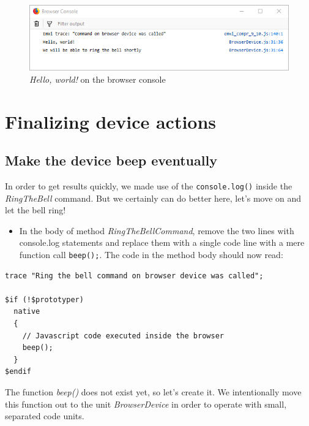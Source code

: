 \documentclass[
  a4paper,
,tablecaptionabove
]{scrbook}
\begin{document}
\begin{figure}
\centering
\includegraphics{./../asciidoc/modules/ROOT/assets/images/deviceintegration/BrowserConsole.png}
\caption{\emph{Hello, world!} on the browser console}
\end{figure}

\hypertarget{_finalizing_device_actions}{%
\section{Finalizing device actions}\label{_finalizing_device_actions}}

\hypertarget{_make_the_device_beep_eventually}{%
\subsection{Make the device beep
eventually}\label{_make_the_device_beep_eventually}}

In order to get results quickly, we made use of the
\texttt{console.log()} inside the \emph{RingTheBell} command. But we
certainly can do better here, let's move on and let the bell ring!

\begin{itemize}
\item
  In the body of method \emph{RingTheBellCommand}, remove the two lines
  with console.log statements and replace them with a single code line
  with a mere function call \texttt{beep();}. The code in the method
  body should now read:
\end{itemize}

\begin{verbatim}
trace "Ring the bell command on browser device was called";

$if (!$prototyper)
  native
  {
    // Javascript code executed inside the browser
    beep();
  }
$endif
\end{verbatim}

The function \emph{beep()} does not exist yet, so let's create it. We
intentionally move this function out to the unit \emph{BrowserDevice} in
order to operate with small, separated code units.
\end{document}
